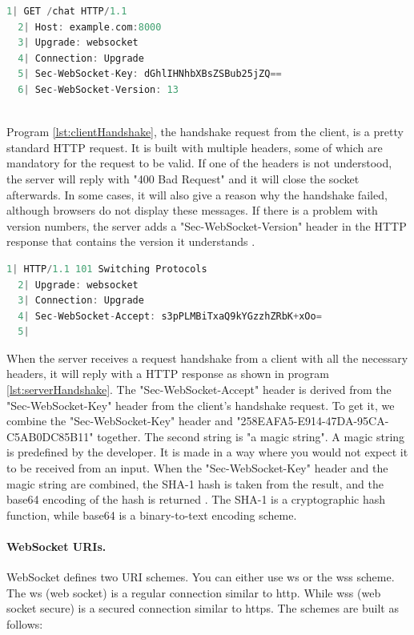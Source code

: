 \documentclass[a4paper, 11pt]{report}
\begin{document}
	\begin{lstlisting}[caption={Client's request for WebSocket handshake},captionpos=b, label={lst:clientHandshake}, language=c, float=h]
  1| GET /chat HTTP/1.1
  2| Host: example.com:8000
  3| Upgrade: websocket
  4| Connection: Upgrade
  5| Sec-WebSocket-Key: dGhlIHNhbXBsZSBub25jZQ==
  6| Sec-WebSocket-Version: 13
	\end{lstlisting}\\
Program \ref{lst:clientHandshake}, the handshake request from the client, is a pretty standard HTTP request. It is built with multiple headers, some of which are mandatory for the request to be valid. If one of the headers is not understood, the server will reply with "400 Bad Request" and it will close the socket afterwards. In some cases, it will also give a reason why the handshake failed, although browsers do not display these messages. If there is a problem with version numbers, the server adds a "Sec-WebSocket-Version" header in the HTTP response that contains the version it understands \cite{BadRequest}.
	\begin{lstlisting}[caption={Server's response for WebSocket handshake},captionpos=b, label={lst:serverHandshake}, language=c, float=h]
  1| HTTP/1.1 101 Switching Protocols
  2| Upgrade: websocket
  3| Connection: Upgrade
  4| Sec-WebSocket-Accept: s3pPLMBiTxaQ9kYGzzhZRbK+xOo=
  5|
	\end{lstlisting}
When the server receives a request handshake from a client with all the necessary headers, it will reply with a HTTP response as shown in program \ref{lst:serverHandshake}. The "Sec-WebSocket-Accept" header is derived from the "Sec-WebSocket-Key" header from the client's handshake request. To get it, we combine the "Sec-WebSocket-Key" header and "258EAFA5-E914-47DA-95CA-C5AB0DC85B11" together. The second string is "a magic string". A magic string is predefined by the developer. It is made in a way where you would not expect it to be received from an input. When the "Sec-WebSocket-Key" header and the magic string are combined, the SHA-1 hash is taken from the result, and the base64 encoding of the hash is returned \cite{BadRequest}. The SHA-1 is a cryptographic hash function, while base64 is a binary-to-text encoding scheme.

		\paragraph{WebSocket URIs.}
WebSocket defines two URI schemes. You can either use ws or the wss scheme. The ws (web socket) is a regular connection similar to http. While wss (web socket secure) is a secured connection similar to https. The schemes are built as follows:\\
\end{document}
